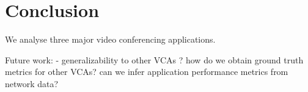 \section{Conclusion}
\label{sec:conclusion}
We analyse three major video conferencing applications.

Future work: 
- generalizability to other VCAs ? how do we obtain ground truth metrics for other VCAs? can we infer application performance metrics from network data?  
